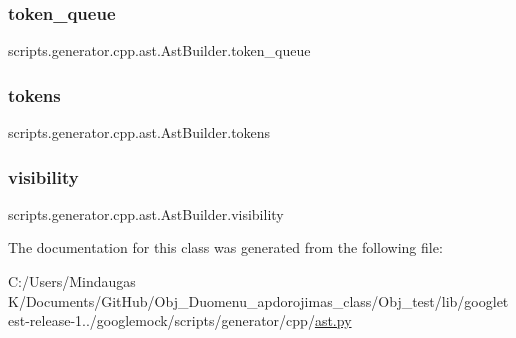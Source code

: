 \subsubsection{\texorpdfstring{token\_queue}{token\_queue}}
{\footnotesize\ttfamily scripts.\+generator.\+cpp.\+ast.\+Ast\+Builder.\+token\+\_\+queue}

\mbox{\label{classscripts_1_1generator_1_1cpp_1_1ast_1_1_ast_builder_a8bff715105a668075aeb9e9509623b21}} 
\subsubsection{\texorpdfstring{tokens}{tokens}}
{\footnotesize\ttfamily scripts.\+generator.\+cpp.\+ast.\+Ast\+Builder.\+tokens}

\mbox{\label{classscripts_1_1generator_1_1cpp_1_1ast_1_1_ast_builder_a5bcdc6b1797cbb658a270387fa6373ef}} 
\subsubsection{\texorpdfstring{visibility}{visibility}}
{\footnotesize\ttfamily scripts.\+generator.\+cpp.\+ast.\+Ast\+Builder.\+visibility}



The documentation for this class was generated from the following file\+:\begin{DoxyCompactItemize}
\item 
C\+:/\+Users/\+Mindaugas K/\+Documents/\+Git\+Hub/\+Obj\+\_\+\+Duomenu\+\_\+apdorojimas\+\_\+class/\+Obj\+\_\+test/lib/googletest-\/release-\/1../googlemock/scripts/generator/cpp/\mbox{\hyperlink{_obj__test_2lib_2googletest-release-1_88_81_2googlemock_2scripts_2generator_2cpp_2ast_8py}{ast.\+py}}\end{DoxyCompactItemize}
